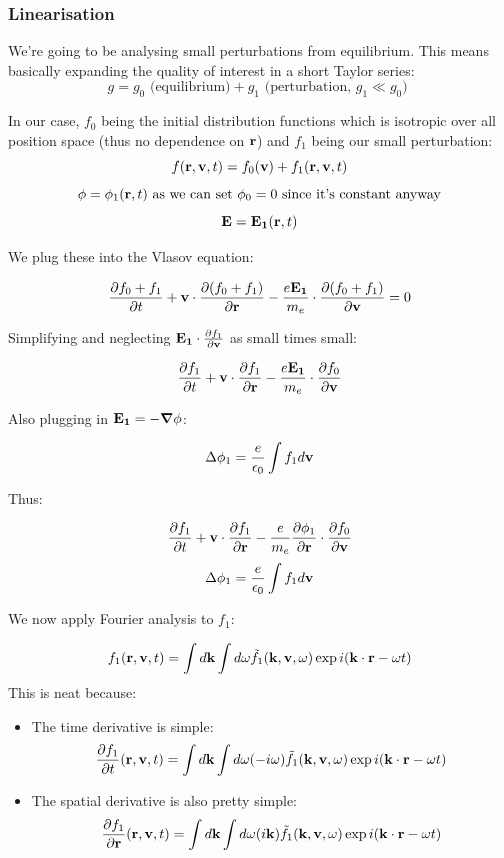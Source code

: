 \subsubsection{Linearisation}

We're going to be analysing small perturbations from equilibrium. This means basically expanding the quality of interest in a short Taylor series:
\[g=g_0 \text{ (equilibrium)} + g_1 \text{ (perturbation, $g_1 \ll g_0$) } \]

In our case, $f_0$ being the initial distribution functions which is isotropic over all position space (thus no dependence on $\mathbf{r}$) and $f_1$ being our small perturbation:
\[f(\mathbf{r}, \mathbf{v}, t) = f_0 (\mathbf{v}) + f_1(\mathbf{r}, \mathbf{v}, t) \]
\[\phi = \phi_1 (\mathbf{r}, t) \text{ as we can set $\phi_0 = 0$ since it's constant anyway} \]
\[\mathbf{E} = \mathbf{E_1} (\mathbf{r}, t)\]

We plug these into the Vlasov equation:

\[ \frac{\partial f_0 + f_1}{\partial t} + \mathbf{v} \cdot \frac{\partial (f_0 + f_1)}{\partial \mathbf{r}} - \frac{e \mathbf{E_1}}{m_e} \cdot \frac{\partial (f_0 + f_1)}{\partial \mathbf{v}} = 0 \]

Simplifying and neglecting $\mathbf{E_1} \cdot \frac{\partial f_1}{\partial \mathbf{v}}$ as small times small:

\[\frac{\partial f_1}{\partial t} + \mathbf{v} \cdot \frac{\partial f_1}{\partial \mathbf{r}} - \frac{e\mathbf{E_1}}{m_e} \cdot \frac{\partial f_0}{\partial \mathbf{v}}\]

Also plugging in $\mathbf{E_1} = -\mbox{\boldmath$ \nabla $} \phi$:

\[ \Delta \phi_1 = \frac{e}{\epsilon_0} \int f_1 d\mathbf{v} \]

Thus:

\[\frac{\partial f_1}{\partial t} + \mathbf{v} \cdot \frac{\partial f_1}{\partial \mathbf{r}} - \frac{e}{m_e}\frac{\partial \phi_1}{\partial \mathbf{r}} \cdot \frac{\partial f_0}{\partial \mathbf{v}}\]
\[ \Delta \phi_1 = \frac{e}{\epsilon_0} \int f_1 d\mathbf{v} \]

We now apply Fourier analysis to $f_1$:

\[ f_1 (\mathbf{r}, \mathbf{v}, t) = \int d\mathbf{k} \int d\omega \tilde{f_1} (\mathbf{k}, \mathbf{v}, \omega) \exp{i(\ensuremath{\mathbf{k}} \cdot \ensuremath{\mathbf{r}} - \omega t)} \]
This is neat because:
\begin{itemize}
\item The time derivative is simple:
\[ \frac{\partial f_1}{\partial t} (\mathbf{r}, \mathbf{v}, t) = \int d\mathbf{k} \int d\omega (-i\omega) \tilde{f_1} (\mathbf{k}, \mathbf{v}, \omega) \exp{i(\ensuremath{\mathbf{k}} \cdot \ensuremath{\mathbf{r}} - \omega t)} \]
\item The spatial derivative is also pretty simple:
\[ \frac{\partial f_1}{\partial \mathbf{r}} (\mathbf{r}, \mathbf{v}, t) = \int d\mathbf{k} \int d\omega (i\mathbf{k}) \tilde{f_1} (\mathbf{k}, \mathbf{v}, \omega) \exp{i(\ensuremath{\mathbf{k}} \cdot \ensuremath{\mathbf{r}} - \omega t)} \]
\end{itemize}

